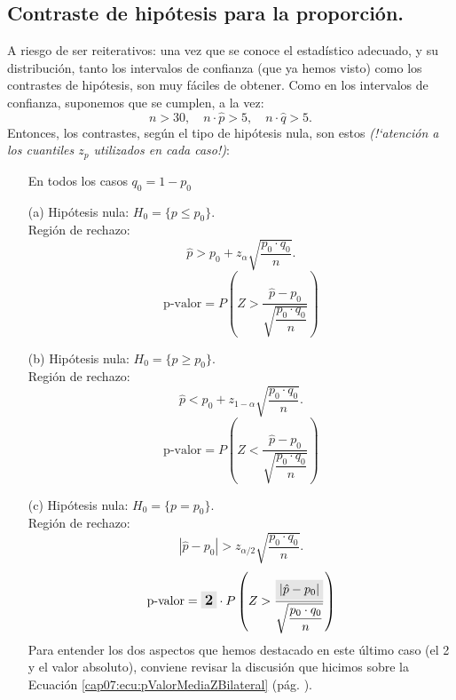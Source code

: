 \subsection{Contraste de hipótesis para la proporción.}
\label{cap08:subsec:ContrasteHipotesisProporcion}

A riesgo de ser reiterativos: una vez que se conoce el estadístico adecuado, y su distribución,
tanto los intervalos de confianza (que ya hemos visto) como los contrastes de hipótesis, son muy
fáciles de obtener. Como en los intervalos de confianza, suponemos que se cumplen, a la vez:
       \[n>30,\quad n\cdot\hat p>5,\quad n\cdot\hat q>5.\]
Entonces, los contrastes, según el tipo de hipótesis nula, son estos {\em ({!`}atención a los
cuantiles $z_p$ utilizados en cada caso!)}:
\begin{enumerate}
    \item[] {\sf En todos los casos $q_0 = 1-p_0$}
    \item[(a)] Hipótesis nula: $H_0=\{p\leq p_0\}$.\\
        Región de rechazo:
        \[\hat p>p_0+z_{\alpha}\sqrt{\dfrac{p_0\cdot q_0}{n}}.\]
        \begin{equation}\label{cap08:ecu:pValorProporcionColaDerecha}
        \mbox{p-valor}=
        P\left(Z > \dfrac{\hat p-p_0}{\sqrt{\dfrac{p_0\cdot q_0}{n}}}\right)
        \end{equation}
    \item[(b)] Hipótesis nula: $H_0=\{p\geq p_0\}$.\\
        Región de rechazo:
        \[\hat p<p_0+z_{1-\alpha}\sqrt{\dfrac{p_0\cdot q_0}{n}}.\]
        \begin{equation}\label{cap08:ecu:pValorProporcionColaIzquierda}
        \mbox{p-valor}=
        P\left(Z < \dfrac{\hat p-p_0}{\sqrt{\dfrac{p_0\cdot q_0}{n}}}\right)
        \end{equation}
    \item[(c)] Hipótesis nula: $H_0=\{p=p_0\}$.\\
        Región de rechazo:
        \[|\hat p-p_0|>z_{\alpha/2}\sqrt{\dfrac{p_0\cdot q_0}{n}}.\]
        \begin{equation}\label{cap08:ecu:pValorProporcionBilateral}
        \mbox{p-valor}=\colorbox{lightgrey}{\large\bf 2}\cdot P\left(Z >
        \dfrac{\colorbox{lightgrey}{$|\hat p-p_0|$}}{\sqrt{\dfrac{p_0\cdot q_0}{n}}}\right)
        \end{equation}
        Para entender los dos aspectos que hemos destacado en este último caso (el 2 y el valor
        absoluto), conviene revisar la discusión que hicimos sobre la Ecuación
        \ref{cap07:ecu:pValorMediaZBilateral} (pág. \pageref{cap07:ecu:pValorMediaZBilateral}).
\end{enumerate}

